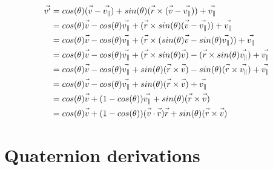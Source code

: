 \documentclass{article}
\newcommand{\fvec}[1]{\vec{\vphantom{A}#1}}
\begin{document}
\begin{equation}
\begin{split}
\fvec{v^{\prime}} & = cos(\theta)(\fvec{v} - \fvec{v_{\parallel}}) + sin(\theta)(\fvec{r} \times (\fvec{v} - \fvec{v_{\parallel}})) + \fvec{v_{\parallel}} \\
& = cos(\theta) \fvec{v} - cos(\theta) \fvec{v_{\parallel}} + (\fvec{r} \times sin(\theta) (\fvec{v} - \fvec{v_{\parallel}})) + \fvec{v_{\parallel}} \\
& = cos(\theta) \fvec{v} - cos(\theta) \fvec{v_{\parallel}} + (\fvec{r} \times (sin(\theta) \fvec{v} - sin(\theta) \fvec{v_{\parallel}})) + \fvec{v_{\parallel}} \\
& = cos(\theta) \fvec{v} - cos(\theta) \fvec{v_{\parallel}} + (\fvec{r} \times sin(\theta) \fvec{v}) - (\fvec{r} \times sin(\theta) \fvec{v_{\parallel}}) + \fvec{v_{\parallel}} \\
& = cos(\theta) \fvec{v} - cos(\theta) \fvec{v_{\parallel}} + sin(\theta) (\fvec{r} \times \fvec{v}) - sin(\theta) (\fvec{r} \times \fvec{v_{\parallel}}) + \fvec{v_{\parallel}} \\
& = cos(\theta) \fvec{v} - cos(\theta) \fvec{v_{\parallel}} + sin(\theta) (\fvec{r} \times \fvec{v}) + \fvec{v_{\parallel}} \\
& = cos(\theta) \fvec{v} + (1 - cos(\theta))\fvec{v_{\parallel}} + sin(\theta) (\fvec{r} \times \fvec{v}) \\
& = cos(\theta) \fvec{v} + (1 - cos(\theta))(\fvec{v} \cdot \fvec{r}) \fvec{r} + sin(\theta) (\fvec{r} \times \fvec{v})
\end{split}
\end{equation}

\section{Quaternion derivations}
\end{document}
